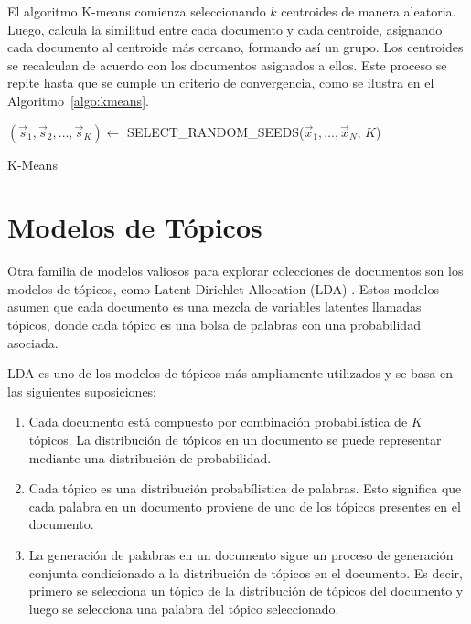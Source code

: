 El algoritmo K-means comienza seleccionando $k$ centroides de manera aleatoria. Luego, calcula la similitud entre cada documento y cada centroide, asignando cada documento al centroide más cercano, formando así un grupo. Los centroides se recalculan de acuerdo con los documentos asignados a ellos. Este proceso se repite hasta que se cumple un criterio de convergencia, como se ilustra en el Algoritmo~\ref{algo:kmeans}.

\begin{algorithm}[H]
    $(\vec{s}_1, \vec{s}_2, \ldots, \vec{s}_K) \leftarrow$ SELECT\_RANDOM\_SEEDS($\vec{x}_1, \ldots, \vec{x}_N$, $K$)\;
    \;
    \caption{K-Means}\label{algo:kmeans}
\end{algorithm}

\section{Modelos de Tópicos}
Otra familia de modelos valiosos para explorar colecciones de documentos son los modelos de tópicos, como Latent Dirichlet Allocation (LDA) \cite{blei2003latent}. Estos modelos asumen que cada documento es una mezcla de variables latentes llamadas tópicos, donde cada tópico es una bolsa de palabras con una probabilidad asociada.

LDA es uno de los modelos de tópicos más ampliamente utilizados y se basa en las siguientes suposiciones:

\begin{enumerate}
 \item Cada documento está compuesto por combinación probabilística de $K$ tópicos. La distribución de tópicos en un documento se puede representar mediante una distribución de probabilidad.

\item Cada tópico es una distribución probabílistica de palabras. Esto significa que cada palabra en un documento proviene de uno de los tópicos presentes en el documento.

\item La generación de palabras en un documento sigue un proceso de generación conjunta condicionado a la distribución de tópicos en el documento. Es decir, primero se selecciona un tópico de la distribución de tópicos del documento y luego se selecciona una palabra del tópico seleccionado.
\end{enumerate}


